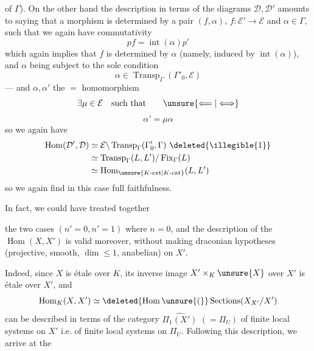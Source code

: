 of $\Gamma$).
On the other hand the description in terms of the diagrams $\mathcal D,\mathcal D'$ amounts to saying that a morphism is determined by a pair $(f,\alpha)$, $f:\mathcal E'\longrightarrow\mathcal E$ and $\alpha\in\Gamma$, such that we again have commutativity
\[
pf=\operatorname{int}(\alpha)p'
\]
which again implies that $f$ is determined by $\alpha$ (namely, induced by $\operatorname{int}(\alpha)$), and $\alpha$ being subject to the sole condition
\[
\alpha\in\operatorname{Transp}_{\Gamma}(\Gamma'_0,\mathcal E)
\]
--- and $\alpha,\alpha'$  the $=$ homomorphism 
\[
\exists\mu\in\mathcal E\quad\text{such that}\qquad\unsure{\Longleftarrow|\Longleftrightarrow}
\]
\[
\alpha'=\mu\alpha
\]
so we again have
\[
\begin{aligned}
\operatorname{Hom}(\mathcal D',\mathcal D)
&\simeq\mathcal E\backslash\operatorname{Transp}_{\Gamma}(\Gamma'_0,\Gamma)\ \deleted{\illegible{1}}\\
&\simeq\operatorname{Transp}_{\Gamma}(L,L')/\operatorname{Fix}_{\Gamma}(L)\\
&\simeq\operatorname{Hom}_{\unsure{K\text{-}\mathrm{ext}|K\text{-}\mathrm{cat}}}(L,L')
\end{aligned}
\]
so we again find in this case  full faithfulness.

In fact, we could have treated together

the two cases $(n'=0,n'=1)$ where $n=0$, and the description of the $\operatorname{Hom}(X,X')$  is valid moreover, without  making draconian hypotheses (projective, smooth, $\dim\leq1$, anabelian) on $X'$.

Indeed, since $X$ is  étale over $K$, its inverse image   $X'\times_K\unsure{X}$ over $X'$ is  étale over $X'$, and
\[
\operatorname{Hom}_K(X,X')\simeq\deleted{\operatorname{Hom}\unsure{(}}\operatorname{Sections}(X_{X'}/X')
\]
can be described in terms of the category $\widehat{\Pi_1(X')}$ $(=\Pi_U)$ of finite local systems on $X'$ i.e. of finite local systems on $\Pi_U$.
Following this description, we arrive at the

